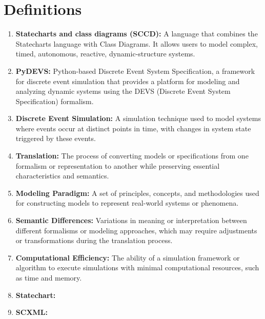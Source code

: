 \section{Definitions}
\begin{enumerate}
    \item \textbf{Statecharts and class diagrams (SCCD):} A language that combines the Statecharts language with Class Diagrams. It allows users to model complex, timed, autonomous, reactive, dynamic-structure systems.
    
    \item \textbf{PyDEVS:} Python-based Discrete Event System Specification, a framework for discrete event simulation that provides a platform for modeling and analyzing dynamic systems using the DEVS (Discrete Event System Specification) formalism.
            
    \item \textbf{Discrete Event Simulation:} A simulation technique used to model systems where events occur at distinct points in time, with changes in system state triggered by these events.
    
    \item \textbf{Translation:} The process of converting models or specifications from one formalism or representation to another while preserving essential characteristics and semantics.
    
    \item \textbf{Modeling Paradigm:} A set of principles, concepts, and methodologies used for constructing models to represent real-world systems or phenomena.
    
    \item \textbf{Semantic Differences:} Variations in meaning or interpretation between different formalisms or modeling approaches, which may require adjustments or transformations during the translation process.
    
    \item \textbf{Computational Efficiency:} The ability of a simulation framework or algorithm to execute simulations with minimal computational resources, such as time and memory.
    
    \item \textbf{Statechart:}

    \item \textbf{SCXML:}
  \end{enumerate}

